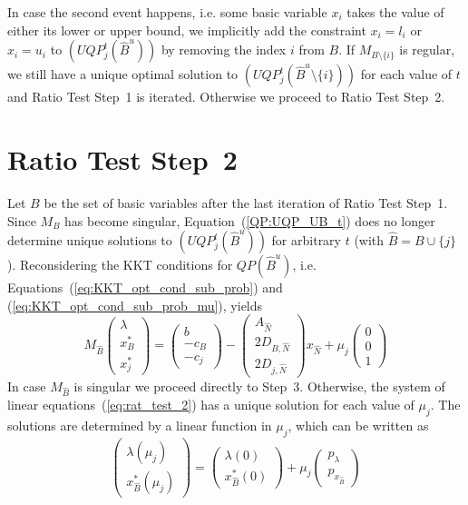 \documentclass[a4paper]{article}
\begin{document}
In case the second event happens, i.e. some basic variable $x_{i}$ takes the
value of either its lower or upper bound, we implicitly add the constraint
$x_{i}=l_{i}$ or $x_{i}=u_{i}$ to $(UQP_{j}^{t}(\hat{B}^{u}))$ by removing the
index $i$ from $B$. If $M_{B\setminus \{i\}}$ is regular, we still have a unique
optimal solution to $(UQP_{j}^{t}(\hat{B}^{u} \setminus\{i\}))$ for each value
of $t$ and Ratio Test Step~1 is iterated.
Otherwise we proceed to Ratio Test Step~2.

\section{Ratio Test Step~2}
Let $B$ be the set of basic variables after the last iteration of Ratio Test
Step~1. Since $M_{B}$ has become singular, Equation~(\ref{QP:UQP_UB_t}) does no
longer determine unique solutions to $(UQP_{j}^{t}(\hat{B}^{u}))$ for arbitrary
$t$ (with $\hat{B}=B \cup \{j\}$). Reconsidering the KKT conditions for
$QP(\hat{B}^{u})$, i.e. Equations~(\ref{eq:KKT_opt_cond_sub_prob}) and
(\ref{eq:KKT_opt_cond_sub_prob_mu}), yields
\begin{equation}
\label{eq:rat_test_2}
M_{\hat{B}}
\left(
\begin{array}{c}
\lambda \\
\hline
x_{B}^{*} \\
\hline
x_{j}^{*}
\end{array}
\right)
=
\left(
\begin{array}{c}
b \\
\hline
-c_{B} \\
\hline
-c_{j}
\end{array}
\right)
-
\left(
\begin{array}{c}
A_{\hat{N}} \\
\hline
2D_{B, \hat{N}} \\
\hline
2D_{j, \hat{N}}
\end{array}
\right)
x_{\hat{N}}
+\mu_{j}
\left(
\begin{array}{c}
0 \\
\hline
0 \\
\hline
1
\end{array}
\right)
\end{equation}
In case $M_{\hat{B}}$ is singular we proceed directly to Step~3. Otherwise, the
system of linear equations~(\ref{eq:rat_test_2}) has a unique solution for each
value of $\mu_{j}$. The solutions are determined by a linear function in 
$\mu_{j}$, which can be written as
\begin{equation}
\left(
\begin{array}{c}
\lambda(\mu_{j}) \\
\hline
x_{\hat{B}}^{*}(\mu_{j})
\end{array}
\right)
=
\left(
\begin{array}{c}
\lambda(0) \\
\hline
x_{\hat{B}}^{*}(0)
\end{array}
\right)
+\mu_{j}
\left(
\begin{array}{c}
p_{\lambda} \\
\hline
p_{x_{\hat{B}}}
\end{array}
\right)
\end{equation}
\end{document}
